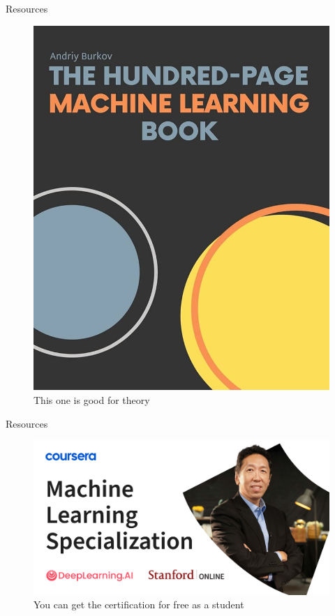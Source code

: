 \documentclass{beamer}
\begin{document}
\begin{frame}{Resources}
\begin{figure}
\begin{minipage}{0.45\linewidth}
            \includegraphics[width=\linewidth]{imgs/ml.jpg}
            \caption{This one is good for theory}
        \end{minipage}
    \end{figure}
\end{frame}

\begin{frame}{Resources}
\begin{figure}
    \centering
    \includegraphics[width=0.8\linewidth]{imgs/andrew_ng.png}
    \caption{You can get the certification for free as a student}
\end{figure}
\end{frame}
\end{document}
